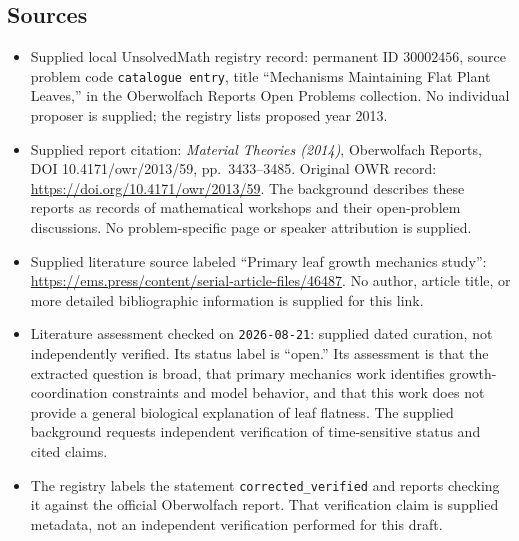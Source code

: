 \documentclass[11pt]{article}
\begin{document}
\subsection{Sources}
\begin{itemize}
\item Supplied local UnsolvedMath registry record: permanent ID \(30002456\), source problem code \texttt{catalogue entry}, title ``Mechanisms Maintaining Flat Plant Leaves,'' in the Oberwolfach Reports Open Problems collection. No individual proposer is supplied; the registry lists proposed year 2013.
\item Supplied report citation: \emph{Material Theories (2014)}, Oberwolfach Reports, DOI 10.4171/owr/2013/59, pp.\ 3433--3485. Original OWR record: \url{https://doi.org/10.4171/owr/2013/59}. The background describes these reports as records of mathematical workshops and their open-problem discussions. No problem-specific page or speaker attribution is supplied.
\item Supplied literature source labeled ``Primary leaf growth mechanics study'': \url{https://ems.press/content/serial-article-files/46487}. No author, article title, or more detailed bibliographic information is supplied for this link.
\item Literature assessment checked on \texttt{2026-08-21}: supplied dated curation, not independently verified. Its status label is ``open.'' Its assessment is that the extracted question is broad, that primary mechanics work identifies growth-coordination constraints and model behavior, and that this work does not provide a general biological explanation of leaf flatness. The supplied background requests independent verification of time-sensitive status and cited claims.
\item The registry labels the statement \texttt{corrected\_verified} and reports checking it against the official Oberwolfach report. That verification claim is supplied metadata, not an independent verification performed for this draft.
\end{itemize}
\end{document}
